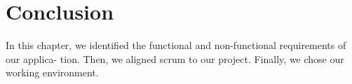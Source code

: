 \section*{Conclusion}

In this chapter, we identified the functional and non-functional requirements of our applica-
tion. Then, we aligned scrum to our project. Finally, we chose our working environment.